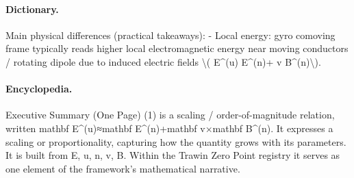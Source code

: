 \paragraph{Dictionary.}
Main physical differences (practical takeaways): - Local energy: gyro comoving frame typically reads higher local electromagnetic energy near moving conductors / rotating dipole due to induced electric fields \textbackslash{}( E\textasciicircum{}(u) E\textasciicircum{}(n)+ v B\textasciicircum{}(n)\textbackslash{}).

\paragraph{Encyclopedia.}
Executive Summary (One Page) (1) is a scaling / order-of-magnitude relation, written mathbf E\textasciicircum{}(u)≈mathbf E\textasciicircum{}(n)+mathbf v×mathbf B\textasciicircum{}(n). It expresses a scaling or proportionality, capturing how the quantity grows with its parameters. It is built from E, u, n, v, B. Within the Trawin Zero Point registry it serves as one element of the framework's mathematical narrative.
